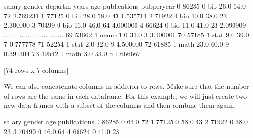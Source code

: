 \documentclass[letterpaper,10pt,english]{sphinxmanual}
\begin{document}
\begin{sphinxVerbatim}[commandchars=\\\{\}]
    salary  gender departm  years   age  publications  pubperyear
0    86285       0     bio   26.0  64.0            72    2.769231
1    77125       0     bio   28.0  58.0            43    1.535714
2    71922       0     bio   10.0  38.0            23    2.300000
3    70499       0     bio   16.0  46.0            64    4.000000
4    66624       0     bio   11.0  41.0            23    2.090909
..     ...     ...     ...    ...   ...           ...         ...
69   53662       1   neuro    1.0  31.0             3    3.000000
70   57185       1    stat    9.0  39.0             7    0.777778
71   52254       1    stat    2.0  32.0             9    4.500000
72   61885       1    math   23.0  60.0             9    0.391304
73   49542       1    math    3.0  33.0             5    1.666667

[74 rows x 7 columns]
\end{sphinxVerbatim}

We can also concatenate columns in addition to rows. Make sure that the number of rows are the same in each dataframe. For this example, we will just create two new data frames with a subset of the columns and then combine them again.

\begin{sphinxVerbatim}[commandchars=\\\{\}]
  \PYG{p}{[}\PYG{p}{[} \PYG{p}{]}\PYG{p}{]}
  \PYG{p}{[}\PYG{p}{[} \PYG{p}{]}\PYG{p}{]}
  \PYG{p}{[} \PYG{p}{]} 
\end{sphinxVerbatim}

\begin{sphinxVerbatim}[commandchars=\\\{\}]
   salary  gender   age  publications
0   86285       0  64.0            72
1   77125       0  58.0            43
2   71922       0  38.0            23
3   70499       0  46.0            64
4   66624       0  41.0            23
\end{sphinxVerbatim}
\end{document}
